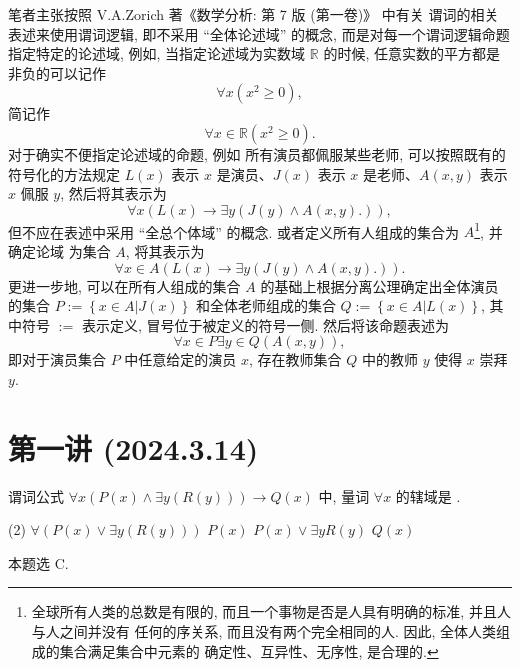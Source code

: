 \documentclass[10pt,UTF8]{ctexbook} %
\begin{document}
笔者主张按照 V.A.Zorich 著《数学分析: 第 7 版 (第一卷)》\cite{zorich1} 中有关
谓词的相关表述来使用谓词逻辑, 即不采用 “全体论述域” 的概念, 而是对每一个谓词逻辑命题
指定特定的论述域, 例如, 当指定论述域为实数域 $\mathbb{R}$ 的时候, 任意实数的平方都是非负的可以记作
\[ \forall x \left( x^2 \geqslant 0 \right), \]
简记作
\[ \forall x \in \mathbb{R} \left( x^2 \geqslant 0 \right). \]
对于确实不便指定论述域的命题, 例如 {\kaishu 所有演员都佩服某些老师},
可以按照既有的符号化的方法规定
$L(x)$ 表示 $x$ 是演员、$J(x)$ 表示 $x$ 是老师、$A(x,y)$ 表示 $x$ 佩服 $y$,
然后将其表示为
\[ \forall x \left( L(x) \to \exists y \left(
        J(y) \wedge A(x,y).
\right) \right), \]
但不应在表述中采用 “全总个体域” 的概念. 或者定义所有人组成的集合为 $A$\footnote{
    全球所有人类的总数是有限的, 而且一个事物是否是人具有明确的标准, 并且人与人之间并没有
    任何的序关系, 而且没有两个完全相同的人. 因此, 全体人类组成的集合满足集合中元素的
    确定性、互异性、无序性, 是合理的.
}, 并确定论域
为集合 $A$, 将其表示为
\[ \forall x \in A \left( L(x) \to \exists y \left(
    J(y) \wedge A(x,y).
\right) \right). \]
更进一步地, 可以在所有人组成的集合 $A$ 的基础上根据分离公理确定出全体演员的集合 $P
:= \left\{ x \in A | J(x) \right\}$ 和全体老师组成的集合
$Q := \left\{ x \in A | L(x) \right\}$, 
其中符号 $:=$ 表示定义, 冒号位于被定义的符号一侧.
然后将该命题表述为
\[ \forall x \in P\exists y \in Q \left( A(x, y) \right), \]
即{\kaishu 对于演员集合 $P$ 中任意给定的演员 $x$, 存在教师集合 $Q$ 中的教师 $y$ 使得 $x$ 崇拜 $y$}.

\section{第一讲 (2024.3.14)}

\begin{exercise}
    谓词公式 $\forall x \left(
        P(x) \wedge \exists y \left( R(y) \right)
    \right) \to Q(x)$
    中, 量词 $\forall x$ 的辖域是 \underline{\qquad \qquad \qquad}.
    \begin{tasks}[label={\Alph*.}](2)
        \task $\forall \left(
            P(x) \vee \exists y \left( R(y) \right)
        \right)$
        \task $P(x)$
        \task $P(x) \vee \exists y R(y)$
        \task $Q(x)$
    \end{tasks}
    \begin{sol}
        本题选 C.
    \end{sol}
\end{exercise}
\end{document}

